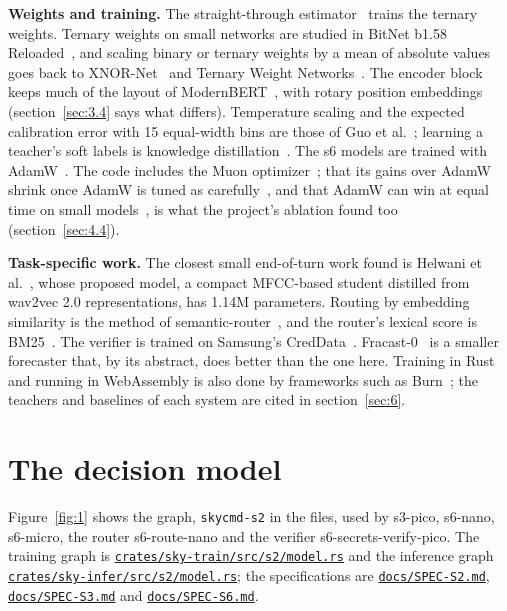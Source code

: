 \documentclass[10pt]{article}
\begin{document}
\textbf{Weights and training.} The straight-through estimator~\cite{bengio2013ste} trains the ternary weights. Ternary weights on small networks are studied in BitNet b1.58 Reloaded~\cite{nielsen2024reloaded}, and scaling binary or ternary weights by a mean of absolute values goes back to XNOR-Net~\cite{rastegari2016xnor} and Ternary Weight Networks~\cite{li2016twn}. The encoder block keeps much of the layout of ModernBERT~\cite{warner2024modernbert}, with rotary position embeddings~\cite{su2021roformer} (section~\ref{sec:3.4} says what differs). Temperature scaling and the expected calibration error with 15 equal-width bins are those of Guo et al.~\cite{guo2017calibration}; learning a teacher's soft labels is knowledge distillation~\cite{hinton2015distilling}. The s6 models are trained with AdamW~\cite{loshchilov2019adamw}. The code includes the Muon optimizer~\cite{jordan2024muon}; that its gains over AdamW shrink once AdamW is tuned as carefully~\cite{wen2025optimizers}, and that AdamW can win at equal time on small models~\cite{akhtar2026muon}, is what the project's ablation found too (section~\ref{sec:4.4}).

\textbf{Task-specific work.} The closest small end-of-turn work found is Helwani et al.~\cite{helwani2026eot}, whose proposed model, a compact MFCC-based student distilled from wav2vec 2.0 representations, has 1.14M parameters. Routing by embedding similarity is the method of semantic-router~\cite{semrouter}, and the router's lexical score is BM25~\cite{robertson2009bm25}. The verifier is trained on Samsung's CredData~\cite{creddata}. Fracast-0~\cite{zhan2026fracast} is a smaller forecaster that, by its abstract, does better than the one here. Training in Rust and running in WebAssembly is also done by frameworks such as Burn~\cite{burn}; the teachers and baselines of each system are cited in section~\ref{sec:6}.

\section{The decision model}\label{sec:3}

Figure~\ref{fig:1} shows the graph, \texttt{skycmd-s2} in the files, used by s3-pico, s6-nano, s6-micro, the router s6-route-nano and the verifier s6-secrets-verify-pico. The training graph is \href{https://github.com/maxgfr/skycmd/blob/main/crates/sky-train/src/s2/model.rs}{\texttt{crates/\allowbreak{}sky-train/\allowbreak{}src/\allowbreak{}s2/\allowbreak{}model.rs}} and the inference graph \href{https://github.com/maxgfr/skycmd/blob/main/crates/sky-infer/src/s2/model.rs}{\texttt{crates/\allowbreak{}sky-infer/\allowbreak{}src/\allowbreak{}s2/\allowbreak{}model.rs}}; the specifications are \href{https://github.com/maxgfr/skycmd/blob/main/docs/SPEC-S2.md}{\texttt{docs/\allowbreak{}SPEC-S2.md}}, \href{https://github.com/maxgfr/skycmd/blob/main/docs/SPEC-S3.md}{\texttt{docs/\allowbreak{}SPEC-S3.md}} and \href{https://github.com/maxgfr/skycmd/blob/main/docs/SPEC-S6.md}{\texttt{docs/\allowbreak{}SPEC-S6.md}}.
\end{document}
